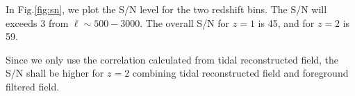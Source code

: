 In Fig.\ref{fig:sn}, we plot the S/N level for the two redshift bins. 
The S/N will exceeds 3 from $\ell \sim 500-3000$. 
The overall S/N for $z=1$ is 45, and for $z=2$ is 59. 

Since we only use the correlation calculated from tidal reconstructed field, the S/N shall be higher for $z=2$  
combining tidal reconstructed field and foreground filtered field. 

